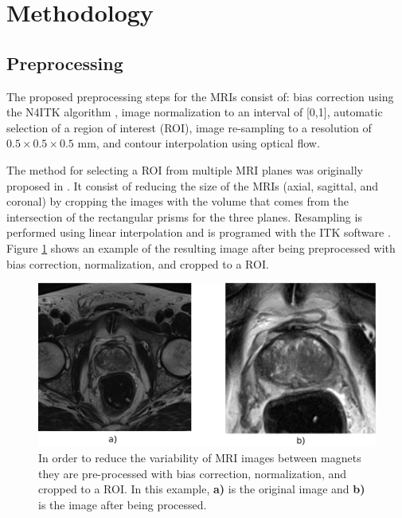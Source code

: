 \section{Methodology}
\label{sec:methods}



\subsection{Preprocessing}
\label{subsec:prepro}
The proposed preprocessing steps for the MRIs consist of: bias correction using the N4ITK algorithm \cite{n4itk}, image normalization to an interval of [0,1], automatic selection of a region of interest (ROI), image re-sampling to a resolution of $0.5 \times 0.5 \times 0.5$ mm, and contour interpolation using optical flow.  

The method for selecting a ROI from multiple MRI planes was originally proposed in \cite{anneke}. It consist of reducing the size of the MRIs (axial, sagittal, and coronal) by cropping the images with the volume that comes from the intersection of the rectangular prisms for the three planes. Resampling is performed using linear interpolation and is programed with the ITK software \cite{itk}.  Figure \ref{fig_1} shows an example of the resulting image after being preprocessed with bias correction, normalization, and cropped to a ROI. 

\begin{figure}[h]
    \centering
    \includegraphics[totalheight=.25\textheight]{figures/Figure1.eps}
    \caption{In order to reduce the variability of MRI images between magnets they are pre-processed with bias correction, normalization, and cropped to a ROI. In this example, \textbf{a)} is the original image and \textbf{b)} is the image after being processed.} 
    \label{fig_1}
\end{figure}

